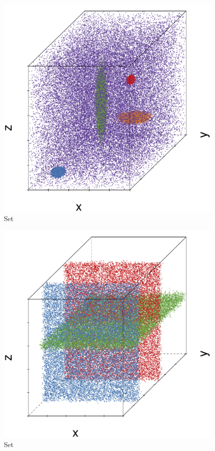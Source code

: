\begin{subfigure}{0.23\textwidth}
	\centering
	\includegraphics[width=\textwidth]{3/img/datasetplot_baakman_3_120000.pdf}
	\caption{Set \baakmanThree}
	\label{fig:3:simulated:datasets:baakman3}
\end{subfigure}			
\begin{subfigure}{0.23\textwidth}
	\centering
	\includegraphics[width=\textwidth]{3/img/datasetplot_ferdosi_5_60000.pdf}
	\caption{Set \ferdosiFive}
	\label{fig:3:simulated:datasets:ferdosi5}
\end{subfigure}	